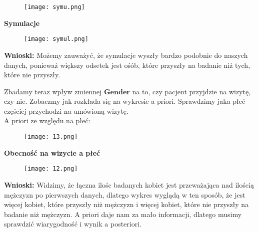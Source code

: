 \documentclass[12pt]{article}
\begin{document}
\begin{flushright}
\begin{figure}[ht!]
\texttt{[image: symu.png]}
\label{fig:2}
\end{figure}
\end{flushright}
\begin{center}
\textbf{Symulacje}
\end{center}
\begin{figure}[ht!]
\begin{center}
\texttt{[image: symul.png]}
\label{fig:2}
\end{center}
\end{figure}
\textbf{Wnioski:} Możemy zauważyć, że symulacje wyszły bardzo podobnie do naszych danych, ponieważ większy odsetek jest ośób, które przyszły na badanie niż tych, które nie przyszły.

\newpage
Zbadamy teraz wpływ zmiennej $\textbf{Gender}$ na to, czy pacjent przyjdzie na wizytę, czy nie. Zobaczmy jak rozkłada się na wykresie a priori. Sprawdzimy jaka płeć częściej przychodzi na umówioną wizytę.\\

A priori ze względu na płeć:

\begin{flushright}
\begin{figure}[ht!]
\texttt{[image: 13.png]}
\label{fig:2}
\end{figure}
\end{flushright}
\begin{center}
\textbf{Obecność na wizycie a płeć}    
\end{center}
\begin{figure}[ht!]
\begin{center}
\texttt{[image: 12.png]}
\label{fig:2}
\end{center}
\end{figure}

\textbf{Wnioski:} Widzimy, że łączna ilośc badanych kobiet jest przeważająca nad ilością mężczyzn po pierwszych danych, dlatego wykres wyglądą w ten sposób, że jest więcej kobiet, które przyszły niż mężczyzn i więcej kobiet, które nie przyszły na badanie niż mężczyzn. A priori daje nam za mało informacji, dlatego musimy sprawdzić wiarygodność i wynik a posteriori.
\end{document}
